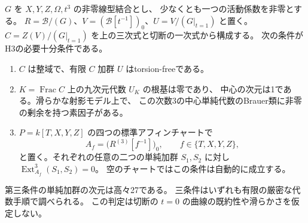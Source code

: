 \begin{theorem}\label{thm:cubic-CY-three-alpha-primitive-triangle-test}
$G$ を $X,Y,Z,\Omega,t^3$ の非零線型結合とし、
少なくとも一つの活動係数を非零とする。
$R=\mathcal B/(G)$、$V=(\mathcal B[t^{-1}])_0$、$U=V/(G|_{t=1})$ と置く。
$C=Z(V)/(G|_{t=1})$ を上の三次式と切断の一次式から構成する。
次の条件がH3の必要十分条件である。
\begin{enumerate}
\item $C$ は整域で、有限 $C$ 加群 $U$ はtorsion-freeである。
\item $K=\operatorname{Frac}C$ 上の九次元代数 $U_K$ の根基は零であり、
中心の次元は1である。滑らかな射影モデル上で、
この次数3の中心単純代数のBrauer類に非零の剰余を持つ素因子がある。
\item $P=k[T,X,Y,Z]$ の四つの標準アフィンチャートで
\[
 A_f=\bigl(R^{(3)}[f^{-1}]\bigr)_0,
 \qquad f\in\{T,X,Y,Z\},
\]
と置く。それぞれの任意の二つの単純加群 $S_1,S_2$ に対し
$\operatorname{Ext}^3_{A_f}(S_1,S_2)=0$。
空のチャートではこの条件は自動的に成立する。
\end{enumerate}
第三条件の単純加群の次元は高々27である。
三条件はいずれも有限の厳密な代数手順で調べられる。
この判定は切断の $t=0$ の曲線の既約性や滑らかさを仮定しない。
\end{theorem}
